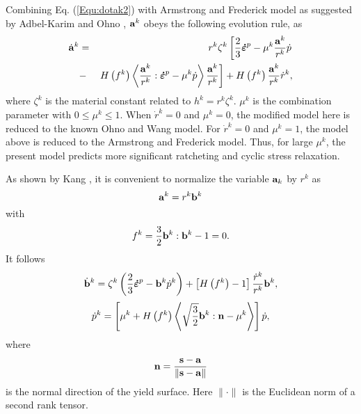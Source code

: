 \documentclass[preprint,5p,twocolumn,11pt,sort&compress]{elsarticle}
\newcommand{\dotbfepsilon}{{\mbox{\boldmath{$\dot\varepsilon$}}}}
\newcommand{\bfn}{{\bf n}}
\newcommand{\bfa}{{\bf a}}
\newcommand{\bfb}{{\bf b}}
\newcommand{\bfs}{{\bf s}}
\begin{document}
Combining Eq. (\ref{Equ:dotak2}) with Armstrong and Frederick model as suggested by Adbel-Karim and Ohno  \cite{AbdelKarim20051303},  ${\bfa^k}$ obeys the following evolution rule, as
\begin{eqnarray}
\label{Equ:dotak3}
{\dot\bfa^k} &=& {r^k}{\zeta ^k}\left[ \frac{2}{3}{{\dotbfepsilon}^p} - {\mu ^k}\frac{\bfa^k}{r^k}\dot p \right.
\\ \nonumber
&-& \left.  H\left( {f^k} \right) \left\langle {\frac{\bfa^k}{r^k}:{\dotbfepsilon}^p} - {\mu ^k}\dot p \right\rangle \frac{\bfa^k}{r^k} \right]
+ H\left( {f^k} \right)\frac{\bfa^k}{r^k}{\dot r^k},
\end{eqnarray}
where ${\zeta ^k}$ is the material constant related to ${h^k} = {r^k}{\zeta ^k}$. ${\mu ^k}$ is the combination parameter with $0 \leqslant {\mu ^k} \leqslant 1$. When ${\dot r^k} = 0$ and ${\mu ^k} = 0$, the modified model here is reduced to the known Ohno and Wang model. For ${\dot r^k} = 0$ and ${\mu ^k} = 1$, the  model above is reduced to the Armstrong and Frederick model. Thus, for large ${\mu ^k}$, the present model predicts more significant ratcheting and cyclic stress relaxation.


As shown by Kang \cite{Kang2004299}, it is convenient to normalize the variable $\bfa_k$ by $r^k$ as
\begin{equation}
\label{Equ:ak1}
{\bfa^k} = {r^k}{\bfb^k}
\end{equation}
with
\begin{equation}
{f^k} = \frac{3}{2}{\bfb^k}:{\bfb^k} - 1 = 0.
\end{equation}
It follows
\begin{equation}
{\dot\bfb^k} = {\zeta ^k}\left( {\frac{2}{3}{\dotbfepsilon^p} - {\bfb^k}{{\dot p}^k}} \right) + \left[ {H\left( {{f^k}} \right) - 1} \right]\frac{{{{\dot r}^k}}}{{{r^k}}}{\bfb^k},
\end{equation}
\begin{equation}
{\dot p^k} = \left[ {{\mu ^k} + H\left( {{f^k}} \right)\left\langle {\sqrt {\frac{3}{2}} {\bfb^k}:\bfn - {\mu ^k}} \right\rangle } \right]\dot p,
\end{equation}
where
\[\bfn = \frac{{\bfs - \bfa}}{{\left\| {\bfs - \bfa} \right\|}}
\]
is the normal direction of the yield surface. Here $\parallel\cdot\parallel$ is the Euclidean norm of a second rank tensor.
\end{document}

